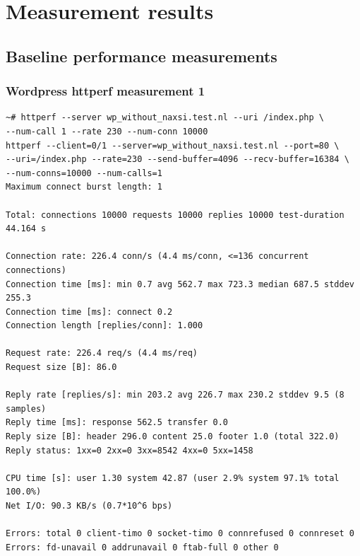 \documentclass[Measurement results]{subfiles}
\begin{document}
\newpage
\section{Measurement results}
\label{sec:Measurement results}

\subsection{Baseline performance measurements}

\subsubsection{Wordpress httperf measurement 1}
\label{sec:baseline_measurement_1}
\begin{verbatim}
~# httperf --server wp_without_naxsi.test.nl --uri /index.php \
--num-call 1 --rate 230 --num-conn 10000
httperf --client=0/1 --server=wp_without_naxsi.test.nl --port=80 \
--uri=/index.php --rate=230 --send-buffer=4096 --recv-buffer=16384 \
--num-conns=10000 --num-calls=1
Maximum connect burst length: 1

Total: connections 10000 requests 10000 replies 10000 test-duration 44.164 s

Connection rate: 226.4 conn/s (4.4 ms/conn, <=136 concurrent connections)
Connection time [ms]: min 0.7 avg 562.7 max 723.3 median 687.5 stddev 255.3
Connection time [ms]: connect 0.2
Connection length [replies/conn]: 1.000

Request rate: 226.4 req/s (4.4 ms/req)
Request size [B]: 86.0

Reply rate [replies/s]: min 203.2 avg 226.7 max 230.2 stddev 9.5 (8 samples)
Reply time [ms]: response 562.5 transfer 0.0
Reply size [B]: header 296.0 content 25.0 footer 1.0 (total 322.0)
Reply status: 1xx=0 2xx=0 3xx=8542 4xx=0 5xx=1458

CPU time [s]: user 1.30 system 42.87 (user 2.9% system 97.1% total 100.0%)
Net I/O: 90.3 KB/s (0.7*10^6 bps)

Errors: total 0 client-timo 0 socket-timo 0 connrefused 0 connreset 0
Errors: fd-unavail 0 addrunavail 0 ftab-full 0 other 0
\end{verbatim}

\newpage
\end{document}

